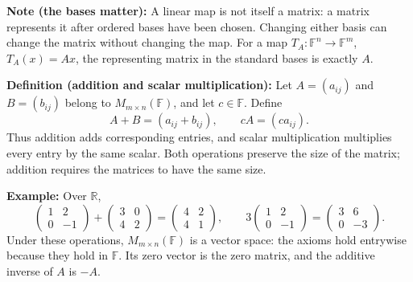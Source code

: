 \documentclass[a4paper,11pt,abstract=true]{scrartcl}
\theoremstyle{dotlessP}
\theoremstyle{dotlessS}
\theoremstyle{remark}
\theoremstyle{definition}
\begin{document}
\begin{remark_box}
\textbf{Note (the bases matter):} A linear map is not itself a
matrix: a matrix represents it after ordered bases have been chosen.
Changing either basis can change the matrix without changing the map.
For a map $T_A:\mathbb{F}^n\longrightarrow\mathbb{F}^m$, $T_A(x)=Ax$,
the representing matrix in the standard bases is exactly $A$.
\end{remark_box}

\begin{claim_box}
\textbf{Definition (addition and scalar multiplication):} Let
$A=(a_{ij})$ and $B=(b_{ij})$ belong to
$M_{m\times n}(\mathbb{F})$, and let $c\in\mathbb{F}$. Define
\[
A+B=(a_{ij}+b_{ij}),\qquad cA=(ca_{ij}).
\]
Thus addition adds corresponding entries, and scalar multiplication
multiplies every entry by the same scalar. Both operations preserve the
size of the matrix; addition requires the matrices to have the same size.
\end{claim_box}

\begin{example_box}
\textbf{Example:} Over $\mathbb{R}$,
\[
\begin{pmatrix}1&2\\0&-1\end{pmatrix}
+\begin{pmatrix}3&0\\4&2\end{pmatrix}
=\begin{pmatrix}4&2\\4&1\end{pmatrix},
\qquad
3\begin{pmatrix}1&2\\0&-1\end{pmatrix}
=\begin{pmatrix}3&6\\0&-3\end{pmatrix}.
\]
Under these operations, $M_{m\times n}(\mathbb{F})$ is a vector space:
the axioms hold entrywise because they hold in $\mathbb{F}$. Its zero
vector is the zero matrix, and the additive inverse of $A$ is $-A$.
\end{example_box}
\end{document}
